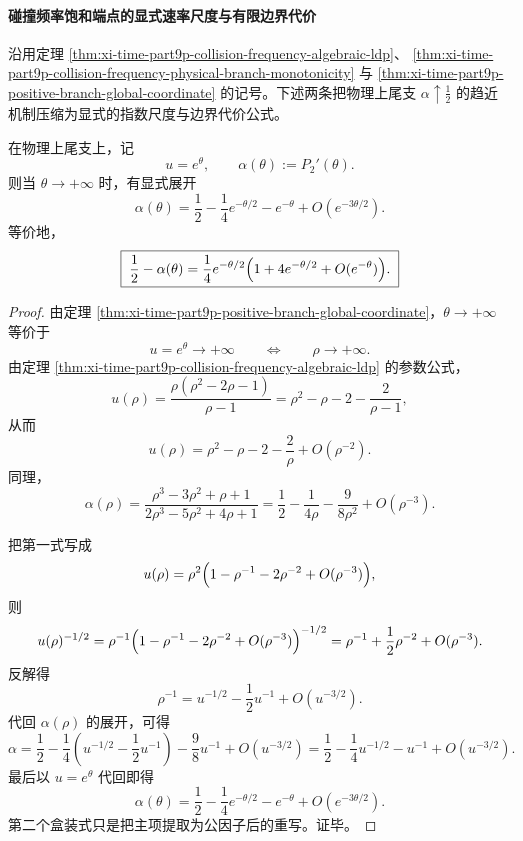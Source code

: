\paragraph{碰撞频率饱和端点的显式速率尺度与有限边界代价}
沿用定理 \ref{thm:xi-time-part9p-collision-frequency-algebraic-ldp}、
\ref{thm:xi-time-part9p-collision-frequency-physical-branch-monotonicity} 与
\ref{thm:xi-time-part9p-positive-branch-global-coordinate} 的记号。下述两条把物理上尾支 \(\alpha\uparrow \frac12\) 的趋近机制压缩为显式的指数尺度与边界代价公式。

\begin{theorem}\label{thm:xi-time-part9pa-collision-saturation-expansion}
在物理上尾支上，记
\[
u=e^\theta,
\qquad
\alpha(\theta):=P_2'(\theta).
\]
则当 \(\theta\to+\infty\) 时，有显式展开
\[
\boxed{\;
\alpha(\theta)
=
\frac12-\frac14e^{-\theta/2}-e^{-\theta}+O(e^{-3\theta/2}).\;}
\]
等价地，
\[
\boxed{\;
\frac12-\alpha(\theta)
=
\frac14e^{-\theta/2}\Bigl(1+4e^{-\theta/2}+O(e^{-\theta})\Bigr).\;}
\]
\end{theorem}
\begin{proof}
由定理 \ref{thm:xi-time-part9p-positive-branch-global-coordinate}，\(\theta\to+\infty\) 等价于
\[
u=e^\theta\to+\infty
\qquad\Longleftrightarrow\qquad
\rho\to+\infty.
\]
由定理 \ref{thm:xi-time-part9p-collision-frequency-algebraic-ldp} 的参数公式，
\[
u(\rho)=\frac{\rho(\rho^2-2\rho-1)}{\rho-1}
=
\rho^2-\rho-2-\frac{2}{\rho-1},
\]
从而
\[
u(\rho)=\rho^2-\rho-2-\frac{2}{\rho}+O(\rho^{-2}).
\]
同理，
\[
\alpha(\rho)
=
\frac{\rho^3-3\rho^2+\rho+1}{2\rho^3-5\rho^2+4\rho+1}
=
\frac12-\frac{1}{4\rho}-\frac{9}{8\rho^2}+O(\rho^{-3}).
\]

把第一式写成
\[
u(\rho)=\rho^2\Bigl(1-\rho^{-1}-2\rho^{-2}+O(\rho^{-3})\Bigr),
\]
则
\[
u(\rho)^{-1/2}
=
\rho^{-1}\Bigl(1-\rho^{-1}-2\rho^{-2}+O(\rho^{-3})\Bigr)^{-1/2}
=
\rho^{-1}+\frac12\rho^{-2}+O(\rho^{-3}).
\]
反解得
\[
\rho^{-1}=u^{-1/2}-\frac12u^{-1}+O(u^{-3/2}).
\]
代回 \(\alpha(\rho)\) 的展开，可得
\[
\alpha
=
\frac12-\frac14\left(u^{-1/2}-\frac12u^{-1}\right)-\frac98u^{-1}+O(u^{-3/2})
=
\frac12-\frac14u^{-1/2}-u^{-1}+O(u^{-3/2}).
\]
最后以 \(u=e^\theta\) 代回即得
\[
\alpha(\theta)=\frac12-\frac14e^{-\theta/2}-e^{-\theta}+O(e^{-3\theta/2}).
\]
第二个盒装式只是把主项提取为公因子后的重写。证毕。
\end{proof}

